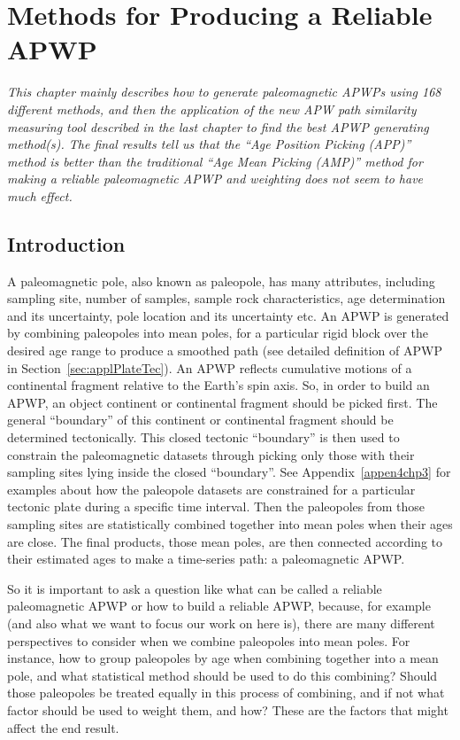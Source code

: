 \chapter{Methods for Producing a Reliable APWP}\label{chap:Reliab}  %
\textit{This chapter mainly describes how to generate paleomagnetic APWPs using
168 different methods, and then the application of the new APW path similarity
measuring tool described in the last chapter to find the best APWP generating
method(s). The final results tell us that the ``Age Position Picking (APP)''  %
method is better than the traditional ``Age Mean Picking (AMP)'' method for
making a reliable paleomagnetic APWP and weighting does not seem to have much
effect.}
\vfill
\minitoc\newpage

\section{Introduction}

A paleomagnetic pole, also known as paleopole, has many attributes, including
sampling site, number of samples, sample rock characteristics, age determination
and its uncertainty, pole location and its uncertainty etc. An APWP is generated
by combining paleopoles into mean poles, for a particular rigid block over the
desired age range to produce a smoothed path (see detailed definition of APWP in
Section~\ref{sec:applPlateTec}). An APWP reflects cumulative motions of a
continental fragment relative to the Earth's spin axis. So, in order to build an
APWP, an object continent or continental fragment should be picked first. The
general ``boundary'' of this continent or continental fragment should be
determined tectonically. This closed tectonic ``boundary'' is then used to
constrain the paleomagnetic datasets through picking only those with their
sampling sites lying inside the closed ``boundary''. See
Appendix~\ref{appen4chp3} for examples about how the paleopole datasets are
constrained for a particular tectonic plate during a specific time interval.
Then the paleopoles from those sampling sites are statistically combined
together into mean poles when their ages are close. The final products, those
mean poles, are then connected according to their estimated ages to make a
time-series path: a paleomagnetic APWP\@.

So it is important to ask a question like what can be called a reliable
paleomagnetic APWP or how to build a reliable APWP, because, for example (and
also what we want to focus our work on here is), there are many different
perspectives to consider when we combine paleopoles into mean poles. For
instance, how to group paleopoles by age when combining together into a mean
pole, and what statistical method should be used to do this combining? Should
those paleopoles be treated equally in this process of combining, and if not
what factor should be used to weight them, and how? These are the factors that
might affect the end result.

